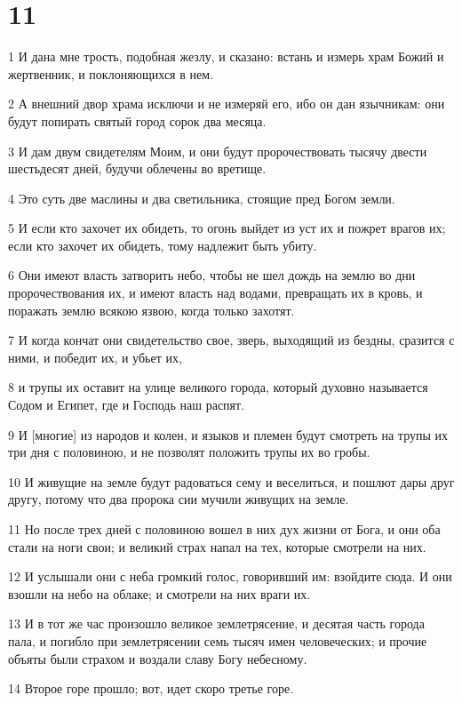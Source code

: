\chapter{11}

\par 1 И дана мне трость, подобная жезлу, и сказано: встань и измерь храм Божий и жертвенник, и поклоняющихся в нем.
\par 2 А внешний двор храма исключи и не измеряй его, ибо он дан язычникам: они будут попирать святый город сорок два месяца.
\par 3 И дам двум свидетелям Моим, и они будут пророчествовать тысячу двести шестьдесят дней, будучи облечены во вретище.
\par 4 Это суть две маслины и два светильника, стоящие пред Богом земли.
\par 5 И если кто захочет их обидеть, то огонь выйдет из уст их и пожрет врагов их; если кто захочет их обидеть, тому надлежит быть убиту.
\par 6 Они имеют власть затворить небо, чтобы не шел дождь на землю во дни пророчествования их, и имеют власть над водами, превращать их в кровь, и поражать землю всякою язвою, когда только захотят.
\par 7 И когда кончат они свидетельство свое, зверь, выходящий из бездны, сразится с ними, и победит их, и убьет их,
\par 8 и трупы их оставит на улице великого города, который духовно называется Содом и Египет, где и Господь наш распят.
\par 9 И [многие] из народов и колен, и языков и племен будут смотреть на трупы их три дня с половиною, и не позволят положить трупы их во гробы.
\par 10 И живущие на земле будут радоваться сему и веселиться, и пошлют дары друг другу, потому что два пророка сии мучили живущих на земле.
\par 11 Но после трех дней с половиною вошел в них дух жизни от Бога, и они оба стали на ноги свои; и великий страх напал на тех, которые смотрели на них.
\par 12 И услышали они с неба громкий голос, говоривший им: взойдите сюда. И они взошли на небо на облаке; и смотрели на них враги их.
\par 13 И в тот же час произошло великое землетрясение, и десятая часть города пала, и погибло при землетрясении семь тысяч имен человеческих; и прочие объяты были страхом и воздали славу Богу небесному.
\par 14 Второе горе прошло; вот, идет скоро третье горе.
